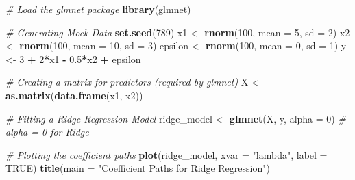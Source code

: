 \documentclass[
  12 pt,
  a4paper,
]{book}
\newenvironment{Shaded}{\begin{snugshade}}{\end{snugshade}}
\newcommand{\AttributeTok}[1]{\textcolor[rgb]{0.13,0.29,0.53}{#1}}
\newcommand{\CommentTok}[1]{\textcolor[rgb]{0.56,0.35,0.01}{\textit{#1}}}
\newcommand{\ConstantTok}[1]{\textcolor[rgb]{0.56,0.35,0.01}{#1}}
\newcommand{\DecValTok}[1]{\textcolor[rgb]{0.00,0.00,0.81}{#1}}
\newcommand{\FloatTok}[1]{\textcolor[rgb]{0.00,0.00,0.81}{#1}}
\newcommand{\FunctionTok}[1]{\textcolor[rgb]{0.13,0.29,0.53}{\textbf{#1}}}
\newcommand{\NormalTok}[1]{#1}
\newcommand{\OtherTok}[1]{\textcolor[rgb]{0.56,0.35,0.01}{#1}}
\newcommand{\SpecialCharTok}[1]{\textcolor[rgb]{0.81,0.36,0.00}{\textbf{#1}}}
\newcommand{\StringTok}[1]{\textcolor[rgb]{0.31,0.60,0.02}{#1}}
\numberwithin{equation}{section}
\theoremstyle{plain}      %
\theoremstyle{definition} %
\theoremstyle{remark}     %
\theoremstyle{note}         %
\begin{document}
\begin{Shaded}
\begin{Highlighting}[]
\CommentTok{\# Load the glmnet package}
\FunctionTok{library}\NormalTok{(glmnet)}

\CommentTok{\# Generating Mock Data}
\FunctionTok{set.seed}\NormalTok{(}\DecValTok{789}\NormalTok{)}
\NormalTok{x1 }\OtherTok{\textless{}{-}} \FunctionTok{rnorm}\NormalTok{(}\DecValTok{100}\NormalTok{, }\AttributeTok{mean =} \DecValTok{5}\NormalTok{, }\AttributeTok{sd =} \DecValTok{2}\NormalTok{)}
\NormalTok{x2 }\OtherTok{\textless{}{-}} \FunctionTok{rnorm}\NormalTok{(}\DecValTok{100}\NormalTok{, }\AttributeTok{mean =} \DecValTok{10}\NormalTok{, }\AttributeTok{sd =} \DecValTok{3}\NormalTok{)}
\NormalTok{epsilon }\OtherTok{\textless{}{-}} \FunctionTok{rnorm}\NormalTok{(}\DecValTok{100}\NormalTok{, }\AttributeTok{mean =} \DecValTok{0}\NormalTok{, }\AttributeTok{sd =} \DecValTok{1}\NormalTok{)}
\NormalTok{y }\OtherTok{\textless{}{-}} \DecValTok{3} \SpecialCharTok{+} \DecValTok{2}\SpecialCharTok{*}\NormalTok{x1 }\SpecialCharTok{{-}} \FloatTok{0.5}\SpecialCharTok{*}\NormalTok{x2 }\SpecialCharTok{+}\NormalTok{ epsilon}

\CommentTok{\# Creating a matrix for predictors (required by glmnet)}
\NormalTok{X }\OtherTok{\textless{}{-}} \FunctionTok{as.matrix}\NormalTok{(}\FunctionTok{data.frame}\NormalTok{(x1, x2))}
 
\CommentTok{\# Fitting a Ridge Regression Model}
\NormalTok{ridge\_model }\OtherTok{\textless{}{-}} \FunctionTok{glmnet}\NormalTok{(X, y, }\AttributeTok{alpha =} \DecValTok{0}\NormalTok{) }\CommentTok{\# alpha = 0 for Ridge}

\CommentTok{\# Plotting the coefficient paths}
\FunctionTok{plot}\NormalTok{(ridge\_model, }\AttributeTok{xvar =} \StringTok{"lambda"}\NormalTok{, }\AttributeTok{label =} \ConstantTok{TRUE}\NormalTok{)}
\FunctionTok{title}\NormalTok{(}\AttributeTok{main =} \StringTok{"Coefficient Paths for Ridge Regression"}\NormalTok{)}
\end{Highlighting}
\end{Shaded}
\end{document}
